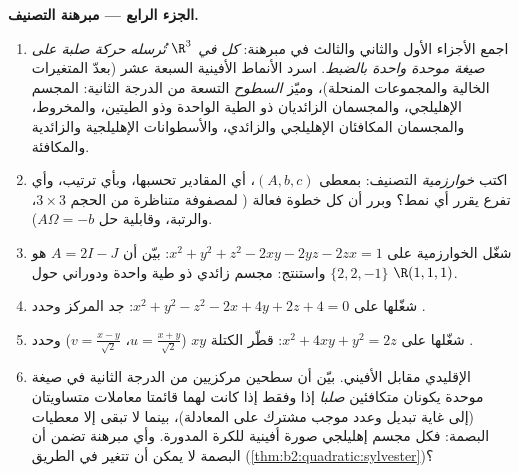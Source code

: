 \begin{problem}
\medskip
\noindent\textbf{الجزء الرابع --- مبرهنة التصنيف.}
\begin{enumerate}[resume]
  \item اجمع الأجزاء الأول والثاني والثالث في مبرهنة: \emph{كل  في $\R^3$ تُرسله حركة صلبة على صيغة موحدة
        واحدة بالضبط}. اسرد الأنماط الأفينية السبعة عشر (بعدّ
        المتغيرات الخالية والمجموعات المنحلة)، وميّز \emph{السطوح} التسعة
        من الدرجة الثانية: المجسم الإهليلجي،
        والمجسمان الزائديان ذو الطية الواحدة وذو الطيتين، والمخروط،
        والمجسمان المكافئان الإهليلجي والزائدي، والأسطوانات
        الإهليلجية والزائدية والمكافئة.
  \item اكتب \emph{خوارزمية} التصنيف: بمعطى $(A,
        b, c)$، أي المقادير
        تحسبها، وبأي ترتيب، وأي تفرع يقرر أي نمط؟ وبرر أن كل خطوة
        فعالة ( لمصفوفة متناظرة من الحجم $3\times3$،
        والرتبة، وقابلية حل $A\Omega = -b$).
  \item شغّل الخوارزمية على $x^2 + y^2 + z^2 - 2xy - 2yz -
        2zx = 1$: بيّن أن  $A = 2I - J$ هو $\{2, 2,
        -1\}$
        واستنتج: مجسم زائدي ذو طية واحدة ودوراني حول $\R(1,1,1)$.
  \item شغّلها على $x^2 + y^2 - z^2 - 2x + 4y + 2z + 4 = 0$: جد المركز وحدد .
  \item شغّلها على $x^2 + 4xy + y^2 = 2z$: قطّر الكتلة $xy$ ($u = \frac{x+y}{\sqrt2}$، $v =
        \frac{x-y}{\sqrt2}$)
        وحدد .
  \item الإقليدي مقابل الأفيني. بيّن أن سطحين مركزيين من الدرجة
        الثانية في صيغة موحدة يكونان متكافئين \emph{صلبا} إذا وفقط
        إذا كانت لهما قائمتا معاملات متساويتان (إلى غاية تبديل وعدد
        موجب مشترك على المعادلة)، بينما لا تبقى \emph{} إلا
        معطيات البصمة: فكل مجسم إهليلجي صورة أفينية للكرة المدورة.
        وأي مبرهنة تضمن أن البصمة لا يمكن أن تتغير في الطريق
        (\cref{thm:b2:quadratic:sylvester})؟
\end{enumerate}


\end{problem}

